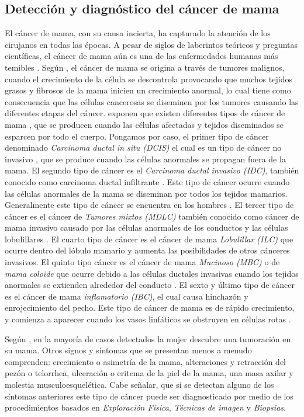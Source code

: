 \subsection{Detección y diagnóstico del cáncer de mama}
El cáncer de mama, con su causa incierta, ha capturado la atención de los cirujanos en todas las épocas. A pesar de siglos de laberintos teóricos y preguntas científicas, el cáncer de mama aún es una de las enfermedades humanas más temibles \cite{Bland2009}. Según \cite{Fatima2020}, el cáncer de mama se origina a través de tumores malignos, cuando el crecimiento de la célula se descontrola provocando que muchos tejidos grasos y fibrosos de la mama inicien un crecimiento anormal, lo cual tiene como consecuencia que las células cancerosas se diseminen por los tumores causando las diferentes etapas del cáncer. \cite{Fatima2020} exponen que existen diferentes tipos de cáncer de mama \cite{Sun2017}, que se producen cuando las células afectadas y tejidos diseminados se esparcen por todo el cuerpo. Pongamos por caso, el primer tipo de cáncer denominado \textit{Carcinoma ductal in situ (DCIS)} el cual es un tipo de cáncer no invasivo \cite{Hou2020}, que se produce cuando las células anormales se propagan fuera de la mama. El segundo tipo de cáncer es el \textit{Carcinoma ductal invasivo (IDC)}, también conocido como carcinoma ductal infiltrante \cite{Chaudhury2011}. Este tipo de cáncer ocurre cuando las células anormales de la mama se diseminan por todos los tejidos mamarios. Generalmente este tipo de cáncer se encuentra en los hombres \cite{Page1982}. El tercer tipo de cáncer es el cáncer de \textit{Tumores mixtos (MDLC)} también conocido como cáncer de mama invasivo \cite{Tuck1997} causado por las células anormales de los conductos y las células lobulillares \cite{Lee2017}. El cuarto tipo de cáncer es el cáncer de mama \textit{Lobulillar (ILC)} \cite{Masciari2007} que ocurre dentro del lóbulo mamario y aumenta las posibilidades de otros cánceres invasivos. El quinto tipo cáncer es el cáncer de mama \textit{Mucinoso (MBC)} o de \textit{mama coloide} \cite{Memis2000} que ocurre debido a las células ductales invasivas cuando los tejidos anormales se extienden alrededor del conducto \cite{Gradilone2011}. El sexto y último tipo de cáncer es el cáncer de mama \textit{inflamatorio (IBC)}, el cual causa hinchazón y enrojecimiento del pecho. Este tipo de cáncer de mama es de rápido crecimiento, y comienza a aparecer cuando los vasos linfáticos se obstruyen en células rotas \cite{Robertson2010}.

Según \cite{Brunicardi2010}, en la mayoría de casos detectados la mujer descubre una tumoración en su mama. Otros signos y síntomas que se presentan menos a menudo comprenden: crecimiento o asimetría de la mama, alteraciones y retracción del pezón o telorrhea, ulceración o eritema de la piel de la mama, una masa axilar y molestia musculoesquelética. Cabe señalar, que si se detectan alguno de los síntomas anteriores este tipo de cáncer puede ser diagnosticado por medio de los procedimientos basados en \textit{Exploración Física}, \textit{Técnicas de imagen} y \textit{Biopsias}. 

